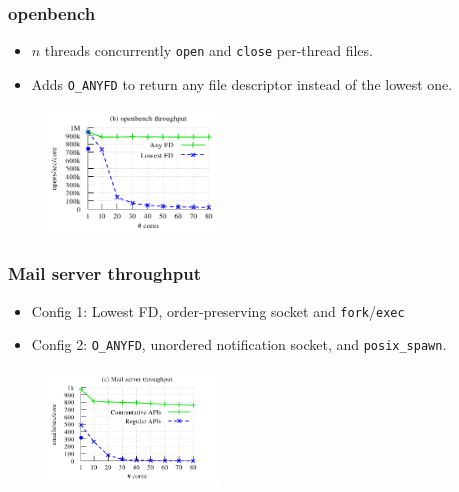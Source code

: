 \documentclass{beamer}
\begin{document}
\begin{frame}
\frametitle{openbench}
\begin{itemize}
\item $n$ threads concurrently \texttt{open} and \texttt{close} per-thread files.
\item Adds \texttt{O\_ANYFD} to return any file descriptor instead of the lowest one.
\end{itemize}

\begin{figure}
   \includegraphics[width=0.4\textwidth]{799-s14-docs/openbench.png}
 \end{figure}

\end{frame}

\begin{frame}
\frametitle{Mail server throughput}

\begin{itemize}
\item Config 1: Lowest FD, order-preserving socket and \texttt{fork}/\texttt{exec}
\item Config 2: \texttt{O\_ANYFD}, unordered notification socket, and \texttt{posix\_spawn}.
\end{itemize}

\begin{figure}
   \includegraphics[width=0.4\textwidth]{799-s14-docs/mailserver.png}
 \end{figure}


\end{frame}
\end{document}
